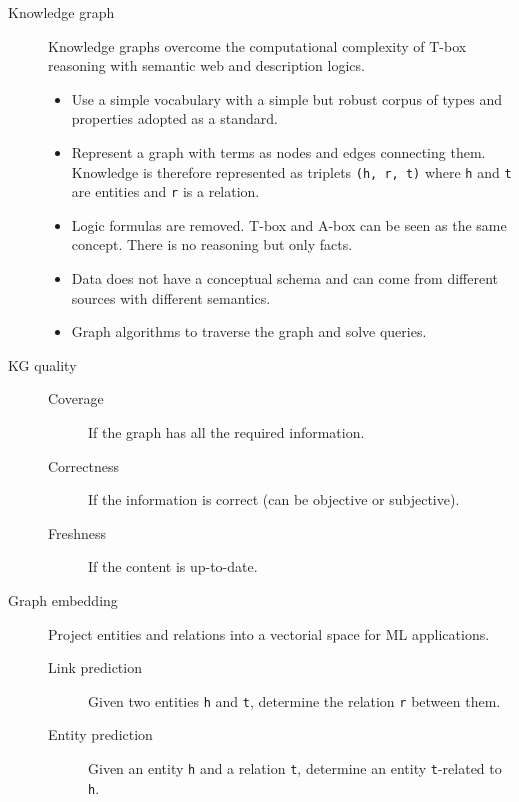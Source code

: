\begin{description}
    \item[Knowledge graph] 
        Knowledge graphs overcome the computational complexity of T-box reasoning with semantic web and description logics.

        \begin{itemize}
            \item Use a simple vocabulary with a simple but robust corpus of types and properties adopted as a standard.
            \item Represent a graph with terms as nodes and edges connecting them.
                Knowledge is therefore represented as triplets \texttt{(h, r, t)} where \texttt{h} and \texttt{t} are entities and \texttt{r} is a relation.
            \item Logic formulas are removed. T-box and A-box can be seen as the same concept. There is no reasoning but only facts.
            \item Data does not have a conceptual schema and can come from different sources with different semantics.
            \item Graph algorithms to traverse the graph and solve queries.
        \end{itemize}

    \item[KG quality] 
        \begin{description}
            \item[Coverage] If the graph has all the required information.
            \item[Correctness] If the information is correct (can be objective or subjective).
            \item[Freshness] If the content is up-to-date.
        \end{description}

    \item[Graph embedding] 
        Project entities and relations into a vectorial space for ML applications.
        \begin{description}
            \item[Link prediction] Given two entities \texttt{h} and \texttt{t}, determine the relation \texttt{r} between them.
            \item[Entity prediction] Given an entity \texttt{h} and a relation \texttt{t}, determine an entity \texttt{t}-related to \texttt{h}.
        \end{description}
\end{description}